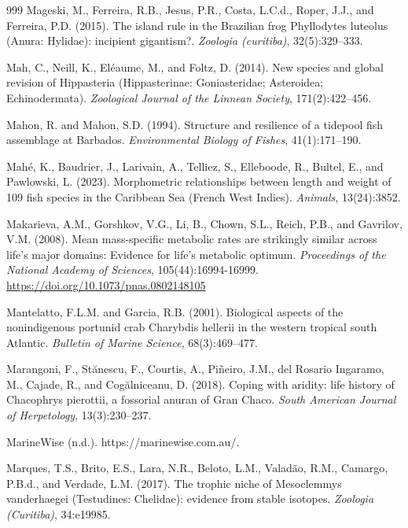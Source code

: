 \begin{thebibliography}{999}
Mageski, M., Ferreira, R.B., Jesus, P.R., Costa, L.C.d., Roper, J.J., and Ferreira, P.D. (2015). The island rule in the Brazilian frog Phyllodytes luteolus (Anura: Hylidae): incipient gigantism?. \textit{Zoologia (curitiba)}, 32(5):329--333.

Mah, C., Neill, K., El{\'e}aume, M., and Foltz, D. (2014). New species and global revision of Hippasteria (Hippasterinae: Goniasteridae; Asteroidea; Echinodermata). \textit{Zoological Journal of the Linnean Society}, 171(2):422--456.

Mahon, R. and Mahon, S.D. (1994). Structure and resilience of a tidepool fish assemblage at Barbados. \textit{Environmental Biology of Fishes}, 41(1):171--190.

Mah{\'e}, K., Baudrier, J., Larivain, A., Telliez, S., Elleboode, R., Bultel, E., and Pawlowski, L. (2023). Morphometric relationships between length and weight of 109 fish species in the Caribbean Sea (French West Indies). \textit{Animals}, 13(24):3852.

Makarieva, A.M., Gorshkov, V.G., Li, B., Chown, S.L., Reich, P.B., and Gavrilov, V.M. (2008). Mean mass-specific metabolic rates are strikingly similar across life's major domains: Evidence for life's metabolic optimum. \textit{Proceedings of the National Academy of Sciences}, 105(44):16994-16999. \url{https://doi.org/10.1073/pnas.0802148105}

Mantelatto, F.L.M. and Garcia, R.B. (2001). Biological aspects of the nonindigenous portunid crab Charybdis hellerii in the western tropical south Atlantic. \textit{Bulletin of Marine Science}, 68(3):469--477.

Marangoni, F., St{\u{a}}nescu, F., Courtis, A., Pi{\~n}eiro, J.M., del Rosario Ingaramo, M., Cajade, R., and Cog{\u{a}}lniceanu, D. (2018). Coping with aridity: life history of Chacophrys pierottii, a fossorial anuran of Gran Chaco. \textit{South American Journal of Herpetology}, 13(3):230--237.

MarineWise (n.d.). https://marinewise.com.au/.

Marques, T.S., Brito, E.S., Lara, N.R., Beloto, L.M., Valad{\~a}o, R.M., Camargo, P.B.d., and Verdade, L.M. (2017). The trophic niche of Mesoclemmys vanderhaegei (Testudines: Chelidae): evidence from stable isotopes. \textit{Zoologia (Curitiba)}, 34:e19985.


\end{thebibliography}
